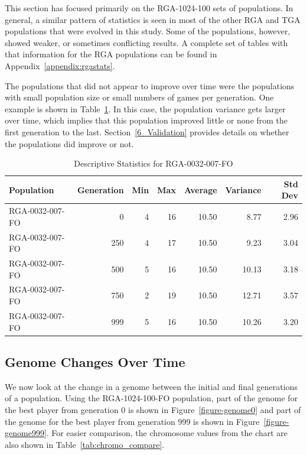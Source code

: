This section has focused primarily on the RGA-1024-100 sets of populations. In
general, a similar pattern of statistics is seen in most of the other RGA and
TGA populations that were evolved in this study. Some of the populations,
however, showed weaker, or sometimes conflicting results. A complete set of
tables with that information for the RGA populations can be found in
Appendix~\ref{appendix:rgastats}.

The populations that did not appear to improve over time were the populations
with small population size or small numbers of games per generation. One example
is shown in Table~\ref{tab:6_RGA-0032-007-FO}. In this case, the population
variance gets larger over time, which implies that this population improved
little or none from the first generation to the last. Section~\ref{6_Validation}
provides details on whether the populations did improve or not.

\begin{table}[htbp]
  \centering
  \caption[RGA-0032-007-FO Statistics]{Descriptive Statistics for RGA-0032-007-FO}
    \begin{tabular}{lrrrrrr}
    \toprule
    Population &  Generation & Min    & Max    & Average & Variance & Std Dev \\
    \midrule
    RGA-0032-007-FO & 0      & 4      & 16     & 10.50  & 8.77   & 2.96 \\
    RGA-0032-007-FO & 250    & 4      & 17     & 10.50  & 9.23   & 3.04 \\
    RGA-0032-007-FO & 500    & 5      & 16     & 10.50  & 10.13  & 3.18 \\
    RGA-0032-007-FO & 750    & 2      & 19     & 10.50  & 12.71  & 3.57 \\
    RGA-0032-007-FO & 999    & 5      & 16     & 10.50  & 10.26  & 3.20 \\ 
    \bottomrule
    \end{tabular}
  \label{tab:6_RGA-0032-007-FO}%
\end{table}%

\subsection{Genome Changes Over Time}

We now look at the change in a genome between the initial and final
generations of a population. Using the RGA-1024-100-FO population, part of
the genome for the best player from generation 0 is shown in
Figure~\ref{figure-genome0} and part of the genome for the best player from
generation 999 is shown in Figure~\ref{figure-genome999}. For easier comparison,
the chromosome values from the chart are also shown in
Table~\ref{tab:chromo_compare}.


